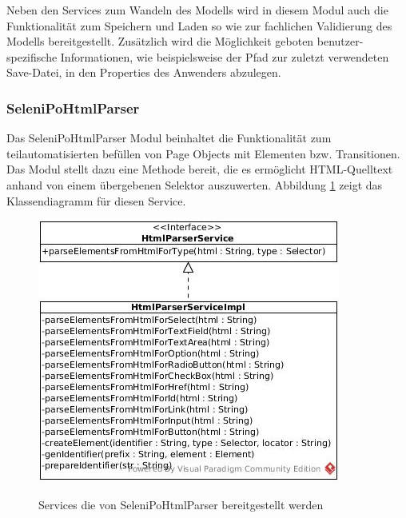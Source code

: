 Neben den Services zum Wandeln des Modells wird in diesem Modul auch die Funktionalität zum Speichern und Laden so wie zur fachlichen Validierung des Modells bereitgestellt.
Zusätzlich wird die Möglichkeit geboten benutzer-spezifische Informationen, wie beispielsweise der Pfad zur zuletzt verwendeten Save-Datei, in den Properties des Anwenders abzulegen.


\subsubsection{SeleniPoHtmlParser}
\label{sec:selenipohtmlparser}

Das SeleniPoHtmlParser Modul beinhaltet die Funktionalität zum teilautomatisierten befüllen von Page Objects mit Elementen bzw. Transitionen.
Das Modul stellt dazu eine Methode bereit, die es ermöglicht HTML-Quelltext anhand von einem übergebenen Selektor auszuwerten.
Abbildung \ref{fig:html_service} zeigt das Klassendiagramm für diesen Service.

\begin{figure}[htb]
  \centering  
  \includegraphics[scale=0.5]{img/HtmlParserService.jpg}\\
  \caption{Services die von SeleniPoHtmlParser bereitgestellt werden}
  \label{fig:html_service}
\end{figure}


